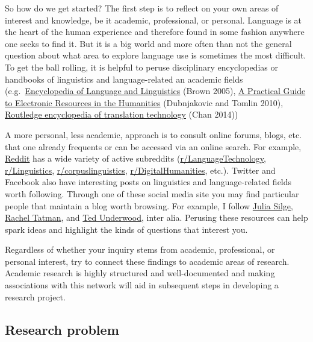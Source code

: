 \documentclass[
  letterpaper,
]{latex/krantz}
\begin{document}
So how do we get started? The first step is to reflect on your own areas
of interest and knowledge, be it academic, professional, or personal.
Language is at the heart of the human experience and therefore found in
some fashion anywhere one seeks to find it. But it is a big world and
more often than not the general question about what area to explore
language use is sometimes the most difficult. To get the ball rolling,
it is helpful to peruse disciplinary encyclopedias or handbooks of
linguistics and language-related an academic fields
(e.g.~\href{https://www.sciencedirect.com/referencework/9780080448541/encyclopedia-of-language-and-linguistics}{Encyclopedia
of Language and Linguistics} (Brown 2005),
\href{https://www.sciencedirect.com/book/9781843345978/a-practical-guide-to-electronic-resources-in-the-humanities}{A
Practical Guide to Electronic Resources in the Humanities} (Dubnjakovic
and Tomlin 2010),
\href{https://www.routledgehandbooks.com/doi/10.4324/9781315749129}{Routledge
encyclopedia of translation technology} (Chan 2014))

A more personal, less academic, approach is to consult online forums,
blogs, etc. that one already frequents or can be accessed via an online
search. For example, \href{https://www.reddit.com/}{Reddit} has a wide
variety of active subreddits
(\href{https://www.reddit.com/r/LanguageTechnology/}{r/LanguageTechnology},
\href{https://www.reddit.com/r/linguistics/}{r/Linguistics},
\href{https://www.reddit.com/r/corpuslinguistics/}{r/corpuslinguistics},
\href{https://www.reddit.com/r/DigitalHumanities/}{r/DigitalHumanities},
etc.). Twitter and Facebook also have interesting posts on linguistics
and language-related fields worth following. Through one of these social
media site you may find particular people that maintain a blog worth
browsing. For example, I follow \href{https://juliasilge.com/}{Julia
Silge}, \href{http://www.rctatman.com/}{Rachel Tatman}, and
\href{https://tedunderwood.com/}{Ted Underwood}, inter alia. Perusing
these resources can help spark ideas and highlight the kinds of
questions that interest you.

Regardless of whether your inquiry stems from academic, professional, or
personal interest, try to connect these findings to academic areas of
research. Academic research is highly structured and well-documented and
making associations with this network will aid in subsequent steps in
developing a research project.

\hypertarget{research-problem}{%
\subsection{Research problem}\label{research-problem}}
\end{document}
